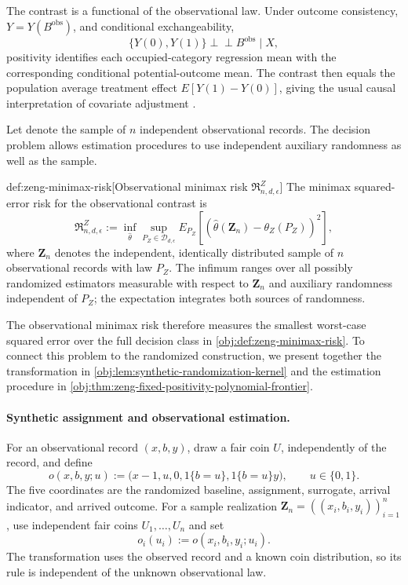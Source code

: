 The contrast  is a functional of the observational law. Under outcome consistency, \(Y=Y(B^{\mathrm{obs}})\), and conditional exchangeability,
\[
\{Y(0),Y(1)\}\perp\!\!\!\perp B^{\mathrm{obs}}\mid X,
\]
positivity identifies each occupied-category regression mean with the corresponding conditional potential-outcome mean. The contrast then equals the population average treatment effect \(E[Y(1)-Y(0)]\), giving the usual causal interpretation of covariate adjustment \citep{Rosenbaum1983}.

Let  denote the sample of \(n\) independent observational records. The decision problem allows estimation procedures to use independent auxiliary randomness as well as the sample.
\begin{definitionv}{def:zeng-minimax-risk}[Observational minimax risk \(\mathfrak R^Z_{n,d,\epsilon}\)]
The minimax squared-error risk for the observational contrast is
\[
\mathfrak R^Z_{n,d,\epsilon}
:=\inf_{\widehat\theta}
\sup_{P_Z\in\mathcal D_{d,\epsilon}}
E_{P_Z}\!\left[
(\widehat\theta(\mathbf Z_n)-\theta_Z(P_Z))^2
\right],
\]
where \(\mathbf Z_n\) denotes the independent, identically distributed sample of \(n\) observational records with law \(P_Z\). The infimum ranges over all possibly randomized estimators measurable with respect to \(\mathbf Z_n\) and auxiliary randomness independent of \(P_Z\); the expectation integrates both sources of randomness.
\end{definitionv}

The observational minimax risk  therefore measures the smallest worst-case squared error over the full decision class in \cref{obj:def:zeng-minimax-risk}. To connect this problem to the randomized construction, we present together the transformation in \cref{obj:lem:synthetic-randomization-kernel} and the estimation procedure in \cref{obj:thm:zeng-fixed-positivity-polynomial-frontier}.

\paragraph{Synthetic assignment and observational estimation.}
For an observational record \((x,b,y)\), draw a fair coin \(U\), independently of the record, and define
\[
o(x,b,y;u)
:=
\bigl(x-1,u,0,1\{b=u\},1\{b=u\}y\bigr),
\qquad u\in\{0,1\}.
\]
The five coordinates are the randomized baseline, assignment, surrogate, arrival indicator, and arrived outcome. For a sample realization \(\mathbf Z_n=((x_i,b_i,y_i))_{i=1}^n\), use independent fair coins \(U_1,\ldots,U_n\) and set
\[
o_i(u_i):=o(x_i,b_i,y_i;u_i).
\]
The transformation uses the observed record and a known coin distribution, so its rule is independent of the unknown observational law.

